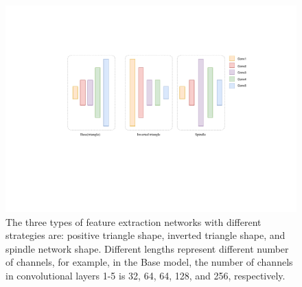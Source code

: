
\begin{figure}
    \begin{center}
    \includegraphics[width=1.0\linewidth]{figures/base_and_spindle.pdf}
    \end{center}
    \caption{The three types of feature extraction networks with different strategies are: positive triangle shape, inverted triangle shape, and spindle network shape. Different lengths represent different number of channels, for example, in the Base model, the number of channels in convolutional layers 1-5 is 32, 64, 64, 128, and 256, respectively.}
    \label{fig:base_and_spindle}
\end{figure}
